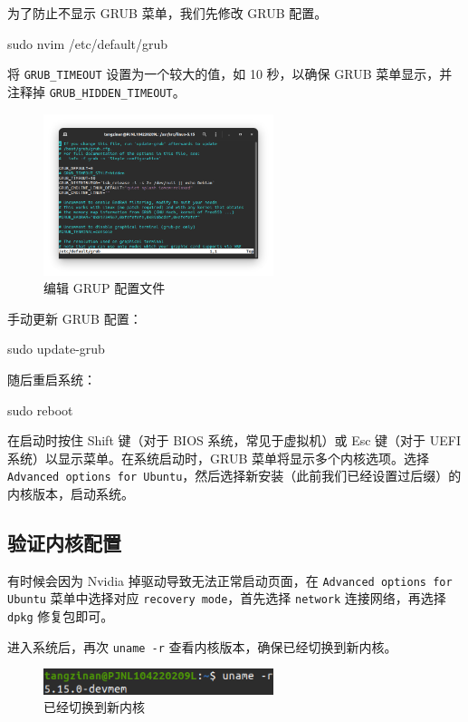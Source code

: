 为了防止不显示 GRUB 菜单，我们先修改 GRUB 配置。
\begin{bashcode}
    sudo nvim /etc/default/grub
\end{bashcode}
将 \texttt{GRUB\_TIMEOUT} 设置为一个较大的值，如 10 秒，以确保 GRUB 菜单显示，并注释掉 \texttt{GRUB\_HIDDEN\_TIMEOUT}。
\begin{figure}[htbp]
    \centering
    \includegraphics[width=0.6\textwidth]{images/grup.png}
    \caption{编辑 GRUP 配置文件}
\end{figure}

手动更新 GRUB 配置：
\begin{bashcode}
    sudo update-grub
\end{bashcode}

随后重启系统：
\begin{bashcode}
    sudo reboot
\end{bashcode}

在启动时按住 Shift 键（对于 BIOS 系统，常见于虚拟机）或 Esc 键（对于 UEFI 系统）以显示菜单。在系统启动时，GRUB 菜单将显示多个内核选项。选择 \texttt{Advanced options for Ubuntu}，然后选择新安装（此前我们已经设置过后缀）的内核版本，启动系统。

\subsection{验证内核配置}

有时候会因为 Nvidia 掉驱动导致无法正常启动页面，在 \texttt{Advanced options for Ubuntu} 菜单中选择对应 \texttt{recovery mode}，首先选择 \texttt{network} 连接网络，再选择 \texttt{dpkg} 修复包即可。

进入系统后，再次 \texttt{uname -r} 查看内核版本，确保已经切换到新内核。
\begin{figure}[htbp]
    \centering
    \includegraphics[width=0.6\textwidth]{images/change.jpeg.png}
    \caption{已经切换到新内核}
\end{figure}

